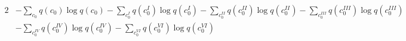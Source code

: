 \documentclass[fleqn]{article}
\begin{document}
\begin{alignat*}{2}
        & - \sum_{c_0} q(c_0) \log q(c_0) - \sum_{c^{\scriptscriptstyle I}_0} q(c^{\scriptscriptstyle I}_0) \log q(c^{\scriptscriptstyle I}_0) - \sum_{c^{\scriptscriptstyle II}_0} q(c^{\scriptscriptstyle II}_0) \log q(c^{\scriptscriptstyle II}_0) - \sum_{c^{\scriptscriptstyle III}_0} q(c^{\scriptscriptstyle III}_0) \log q(c^{\scriptscriptstyle III}_0) \\
        & - \sum_{c^{\scriptscriptstyle IV}_0} q(c^{\scriptscriptstyle IV}_0) \log q(c^{\scriptscriptstyle IV}_0) - \sum_{c^{\scriptscriptstyle VI}_0} q(c^{\scriptscriptstyle VI}_0) \log q(c^{\scriptscriptstyle VI}_0)
\end{alignat*}
\end{document}
